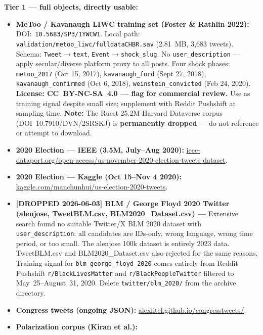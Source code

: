 \documentclass[11pt]{article}
\begin{document}
\begin{taskbox}
{  \smallskip
  \textbf{Tier 1 --- full objects, directly usable:}
  \begin{itemize}[leftmargin=1.6em, itemsep=1pt]
    \item \textbf{MeToo / Kavanaugh LIWC training set (Foster \& Rathlin 2022):}
          DOI:~\texttt{10.5683/SP3/1YWCW1}. Local path:
          \texttt{validation/metoo\_liwc/fulldataCHBR.sav} (2.81~MB,
          3,683 tweets). Schema: \texttt{Tweet}$\to$\texttt{text},
          \texttt{Event}$\to$\texttt{shock\_slug}. No \texttt{user\_description}
          --- apply secular/diverse platform proxy to all posts.
          Four shock phases: \texttt{metoo\_2017} (Oct 15, 2017),
          \texttt{kavanaugh\_ford} (Sept 27, 2018),
          \texttt{kavanaugh\_confirmed} (Oct 6, 2018),
          \texttt{weinstein\_convicted} (Feb 24, 2020).
          \textbf{License: CC~BY-NC-SA~4.0 --- flag for commercial review.}
          Use as training signal despite small size; supplement with Reddit
          Pushshift at sampling time.
          \textbf{Note:} The Ruest 25.2M Harvard Dataverse corpus
          (DOI~10.7910/DVN/2SRSKJ) is \textbf{permanently dropped} ---
          do not reference or attempt to download.
    \item \textbf{2020 Election --- IEEE (3.5M, July--Aug 2020):}
          \url{ieee-dataport.org/open-access/us-november-2020-election-tweets-dataset}.
    \item \textbf{2020 Election --- Kaggle (Oct 15--Nov 4 2020):}
          \url{kaggle.com/manchunhui/us-election-2020-tweets}.
    \item \textbf{[DROPPED 2026-06-03] BLM / George Floyd 2020 Twitter (alenjose,
          TweetBLM.csv, BLM2020\_Dataset.csv) ---} Extensive search found no suitable
          Twitter/X BLM 2020 dataset with \texttt{user\_description}: all
          candidates are IDs-only, wrong language, wrong time period, or too
          small. The alenjose 100k dataset is entirely 2023 data.
          TweetBLM.csv and BLM2020\_Dataset.csv also rejected for the same reasons.
          Training signal for \texttt{blm\_george\_floyd\_2020} comes entirely
          from Reddit Pushshift \texttt{r/BlackLivesMatter} and
          \texttt{r/BlackPeopleTwitter} filtered to
          May~25--August~31, 2020. Delete \texttt{twitter/blm\_2020/} from
          the archive directory.
    \item \textbf{Congress tweets (ongoing JSON):}
          \url{alexlitel.github.io/congresstweets/}.
    \item \textbf{Polarization corpus (Kiran et al.):}

\end{itemize}}
\end{taskbox}
\end{document}
